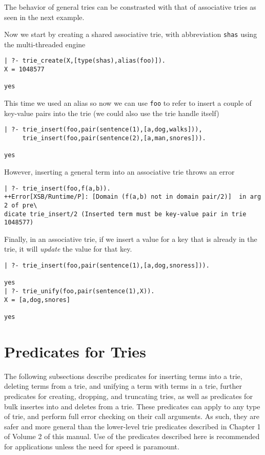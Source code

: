 The behavior of general tries can be constrasted with that of
associative tries as seen in the next example.
\begin{example} \rm
Now we start by creating a shared associative trie, with abbreviation
{\tt shas} using the multi-threaded engine
{\small
\begin{verbatim}
| ?- trie_create(X,[type(shas),alias(foo)]).
X = 1048577

yes
\end{verbatim}
}  \noindent
%
This time we used an alias so now we can use {\tt foo} to refer to
insert a couple of key-value pairs into the trie (we could also use
the trie handle itself) 
{\small
\begin{verbatim}
| ?- trie_insert(foo,pair(sentence(1),[a,dog,walks])), 
     trie_insert(foo,pair(sentence(2),[a,man,snores])).

yes
\end{verbatim}
} \noindent
However, inserting a general term into an associative trie throws an
error
{\small
\begin{verbatim}
| ?- trie_insert(foo,f(a,b)).
++Error[XSB/Runtime/P]: [Domain (f(a,b) not in domain pair/2)]  in arg 2 of pre\
dicate trie_insert/2 (Inserted term must be key-value pair in trie 1048577)
\end{verbatim}
}  \noindent
Finally, in an associative trie, if we insert a value for a key that
is already in the trie, it will {\em update} the value for that key.
{\small
\begin{verbatim}
| ?- trie_insert(foo,pair(sentence(1),[a,dog,snoress])).

yes
| ?- trie_unify(foo,pair(sentence(1),X)).
X = [a,dog,snores]

yes
\end{verbatim}
}

\end{example}

\section{Predicates for Tries} 
%
The following subsections describe predicates for inserting terms into
a trie, deleting terms from a trie, and unifying a term with terms in
a trie, further predicates for creating, dropping, and truncating
tries, as well as predicates for bulk insertes into and deletes from a
trie.  These predicates can apply to any type of trie, and perform
full error checking on their call arguments.  As such, they are safer
and more general than the lower-level trie predicates described in
Chapter 1 of Volume 2 of this manual.  Use of the predicates described
here is recommended for applications unless the need for speed is
paramount.

